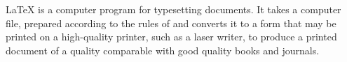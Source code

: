 \documentclass[a4paper,12pt]{article}
\begin{document}
\LaTeX{} is a computer program for typesetting documents. It takes a computer file, prepared according to the rules of \LATEX and converts it to a form that may be printed on a high-quality printer, such as a laser writer, to produce a printed document of a quality comparable with good quality books and journals.
\end{document}
